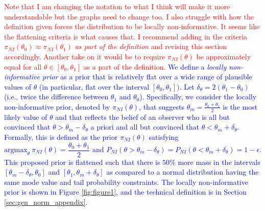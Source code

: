 \documentclass[useAMS,usenatbib,referee]{biom}
\begin{document}
\textcolor{red}{Note that I am changing the notation to what I think will make it more understandable but the graphs need to change too. I also struggle
with how the definition given forces the distribution to be locally non-informative. It seems like the flattening criteria is what causes that. I recommend
adding in the criteria $\pi_{NI}(\theta_0) \approx \pi_{NI}(\theta_1)$ \textit{as part of the definition} and revising this section accordingly. Another
take on it would be to require $\pi_{NI}(\theta)$ be approximately equal for all $\theta \in \left[\theta_0,\theta_1\right]$ as a part of the definition.}
\textcolor{blue}{
We define a \textit{locally non-informative prior} as a prior that is relatively flat over a wide range of plausible values of $\theta$ (in particular, flat 
over the interval $\left[\theta_0,\theta_1\right])$.
%
Let $\delta_{\theta} = 2\left(\theta_1 - \theta_0\right)$ (i.e., twice the difference between $\theta_1$ and $\theta_0$).
%
Specifically, we consider the locally non-informative prior, denoted by $\pi_{NI}(\theta)$, that suggests $\theta_{m}=\frac{\theta_0+\theta_1}{2}$ is the most likely value of $\theta$ 
and that reflects the belief of an observer who is all but convinced that $\theta>\theta_{m} -\delta_{\theta}$ a priori and 
all but convinced that $\theta < \theta_{m} +\delta_{\theta}$. 
%
Formally, this is defined as the prior $\pi_{NI}(\theta)$ satisfying
\begin{equation}\label{eq:niprior}
\text{argmax}_\theta~\pi_{NI}(\theta)=\frac{\theta_0+\theta_1}{2}\text{ and } 
  P_{NI}\left(\theta>\theta_{m}-\delta_{\theta}\right)=P_{NI}\left(\theta< \theta_{m}+\delta_{\theta}\right) =1-\epsilon.
\end{equation}
This proposed prior is flattened such that there is $50\%$ more mass in the intervals $\left[\theta_{m}-\delta_{\theta},\theta_0\right]$ 
and $\left[\theta_1,\theta_{m}+\delta_{\theta}\right]$ as compared to a normal distribution having the same mode value and tail probability constraints. 
%
The locally non-informative prior is shown in Figure \ref{fig:figure1}, and the technical definition is in Section \ref{sec:gen_norm_appendix}.
}
\end{document}
